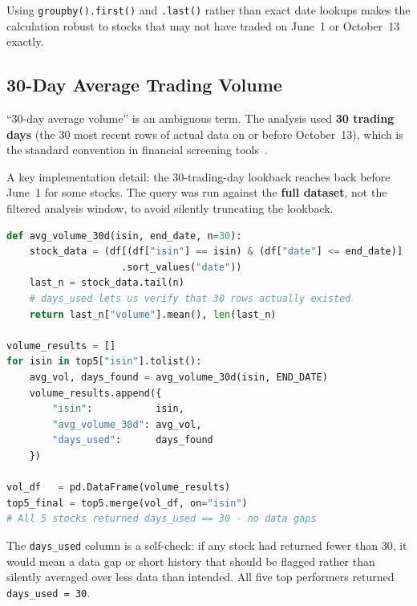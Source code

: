 Using \texttt{groupby().first()} and \texttt{.last()} rather than exact date lookups makes the calculation robust to stocks that may not have traded on June~1 or October~13 exactly.

\subsection{30-Day Average Trading Volume}
\label{subsec:volume}

``30-day average volume'' is an ambiguous term. The analysis used \textbf{30 trading days} (the 30 most recent rows of actual data on or before October~13), which is the standard convention in financial screening tools~\cite{30day_volume}.

A key implementation detail: the 30-trading-day lookback reaches back before June~1 for some stocks. The query was run against the \textbf{full dataset}, not the filtered analysis window, to avoid silently truncating the lookback.

\begin{lstlisting}[language=Python, caption={30-day average volume calculation with a self-check}]
def avg_volume_30d(isin, end_date, n=30):
    stock_data = (df[(df["isin"] == isin) & (df["date"] <= end_date)]
                    .sort_values("date"))
    last_n = stock_data.tail(n)
    # days_used lets us verify that 30 rows actually existed
    return last_n["volume"].mean(), len(last_n)

volume_results = []
for isin in top5["isin"].tolist():
    avg_vol, days_found = avg_volume_30d(isin, END_DATE)
    volume_results.append({
        "isin":           isin,
        "avg_volume_30d": avg_vol,
        "days_used":      days_found
    })

vol_df   = pd.DataFrame(volume_results)
top5_final = top5.merge(vol_df, on="isin")
# All 5 stocks returned days_used == 30 - no data gaps
\end{lstlisting}

The \texttt{days\_used} column is a self-check: if any stock had returned fewer than 30, it would mean a data gap or short history that should be flagged rather than silently averaged over less data than intended. All five top performers returned \texttt{days\_used = 30}.

